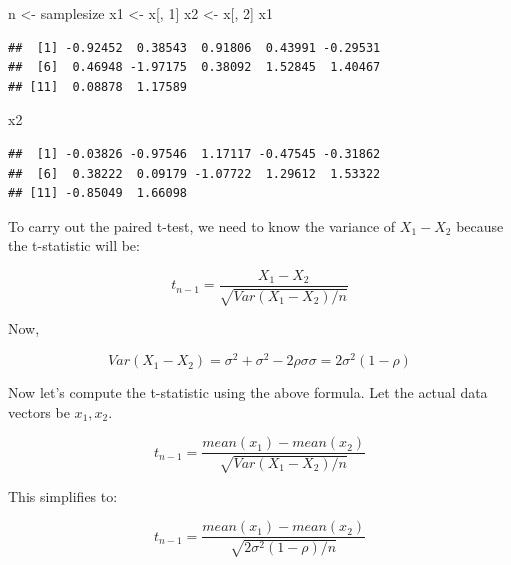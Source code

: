 \documentclass[12pt,]{krantz}
\newenvironment{Shaded}{\begin{snugshade}}{\end{snugshade}}
\newcommand{\DecValTok}[1]{\textcolor[rgb]{0.00,0.00,0.81}{#1}}
\newcommand{\NormalTok}[1]{#1}
\newcommand{\StringTok}[1]{\textcolor[rgb]{0.31,0.60,0.02}{#1}}
\begin{document}
\begin{Shaded}
\begin{Highlighting}[]
\NormalTok{n <-}\StringTok{ }\NormalTok{samplesize}
\NormalTok{x1 <-}\StringTok{ }\NormalTok{x[, }\DecValTok{1}\NormalTok{]}
\NormalTok{x2 <-}\StringTok{ }\NormalTok{x[, }\DecValTok{2}\NormalTok{]}
\NormalTok{x1}
\end{Highlighting}
\end{Shaded}

\begin{verbatim}
##  [1] -0.92452  0.38543  0.91806  0.43991 -0.29531
##  [6]  0.46948 -1.97175  0.38092  1.52845  1.40467
## [11]  0.08878  1.17589
\end{verbatim}

\begin{Shaded}
\begin{Highlighting}[]
\NormalTok{x2}
\end{Highlighting}
\end{Shaded}

\begin{verbatim}
##  [1] -0.03826 -0.97546  1.17117 -0.47545 -0.31862
##  [6]  0.38222  0.09179 -1.07722  1.29612  1.53322
## [11] -0.85049  1.66098
\end{verbatim}

To carry out the paired t-test,
we need to know the variance of \(X_1-X_2\) because the t-statistic will be:

\begin{equation}
t_{n-1} = \frac{X_1 - X_2}{\sqrt{Var(X_1 - X_2)/n}}
\end{equation}

Now,

\begin{equation}
Var(X_1 - X_2) = \sigma^2 + \sigma^2 - 2 \rho \sigma\sigma = 2\sigma^2 (1-\rho)
\end{equation}

Now let's compute the t-statistic using the above formula. Let the actual data vectors be \(x_1, x_2\).

\begin{equation}
t_{n-1} = \frac{mean(x_1) - mean(x_2)}{\sqrt{Var(X_1 - X_2)/n}}
\end{equation}

This simplifies to:

\begin{equation}
t_{n-1} = \frac{mean(x_1) - mean(x_2)}{\sqrt{2\sigma^2(1-\rho)/n}}
\end{equation}
\end{document}
